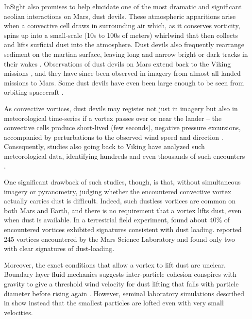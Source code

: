 \documentclass[linenumbers,trackchanges]{aastex63}
\begin{document}
InSight also promises to help elucidate one of the most dramatic and significant aeolian interactions on Mars, dust devils. These atmospheric apparitions arise when a convective cell draws in surrounding air which, as it conserves vorticity, spins up into a small-scale (10s to 100s of meters) whirlwind that then collects and lifts surficial dust into the atmosphere. Dust devils also frequently rearrange sediment on the martian surface, leaving long and narrow bright or dark tracks in their wakes \citep{2016SSRv..203..143R}. Observations of dust devils on Mars extend back to the Viking missions \citep{1985Sci...230..175T}, and they have since been observed in imagery from almost all landed missions to Mars. Some dust devils have even been large enough to be seen from orbiting spacecraft \citep[e.g.,][]{2011GeoRL..3824206C}.

As convective vortices, dust devils may register not just in imagery but also in meteorological time-series if a vortex passes over or near the lander -- the convective cells produce short-lived (few seconds), negative pressure excursions, accompanied by perturbations to the observed wind speed and direction \citep{2016Icar..271..326L}. Consequently, studies also going back to Viking have analyzed such meteorological data, identifying hundreds and even thousands of such encounters .

One significant drawback of such studies, though, is that, without simultaneous imagery or pyranometry, judging whether the encountered convective vortex actually carries dust is difficult. Indeed, such dustless vortices are common on both Mars and Earth, and there is no requirement that a vortex lifts dust, even when dust is available. In a terrestrial field experiment, \citet{LORENZ20151} found about 40\% of encountered vortices exhibited signatures consistent with dust loading. \citet{2016Icar..278..180S} reported 245 vortices encountered by the Mars Science Laboratory and found only two with clear signatures of dust-loading. 

Moreover, the exact conditions that allow a vortex to lift dust are unclear. Boundary layer fluid mechanics suggests inter-particle cohesion conspires with gravity to give a threshold wind velocity for dust lifting that falls with particle diameter before rising again \citep{1985wagp.book.....G}. However, seminal laboratory simulations described in \citet{2010Icar..206..306N} show instead that the smallest particles are lofted even with very small velocities. 
\end{document}
